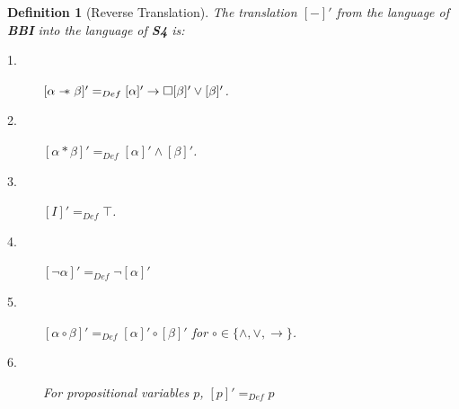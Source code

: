 \documentclass[a4paper]{article}
\newtheorem{definition}[theorem]{Definition}
\newcommand\magicwand{\mathrel{-\mkern-6mu*}}
\newcommand{\BBI}{\textbf{BBI}\xspace}
\newcommand{\SFour}{\textbf{S4}\xspace}
\newcommand{\rev}[1]{[#1]'}
\begin{document}
\begin{definition}[Reverse Translation]\label{Def:Reverse_Translation}
The translation $\rev{-}$ from the language of \BBI into the language of \SFour is:
\begin{description}
    \item[1.] $[\alpha \magicwand \beta]' =_{Def}[\alpha]' \rightarrow \Box[\beta]'\lor [\beta]'$.
    \item[2.]$[\alpha * \beta]' =_{Def}[\alpha]' \land [\beta]'$.
    \item[3.]$[I]'=_{Def}\top$. 
    \item[4.]$[\neg \alpha]'=_{Def}\neg [\alpha]'$ 
    \item[5.]$[\alpha \circ \beta]'=_{Def}[\alpha]'\circ[\beta]'$ for $\circ \in \{\land, \lor, \rightarrow\}$.
    \item[6.]For propositional variables $p$, $[p]'=_{Def}p$ 
\end{description}
    
\end{definition}
\end{document}
